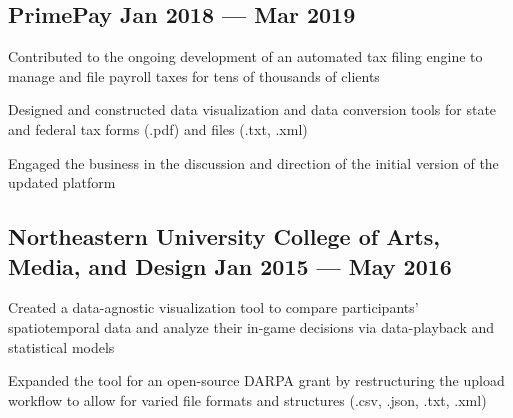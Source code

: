 \subsection{{PrimePay \hfill Jan 2018 --- Mar 2019}}
\begin{zitemize}
\item Contributed to the ongoing development of an automated tax filing engine to manage and file payroll taxes for tens of thousands of clients
\item Designed and constructed data visualization and data conversion tools for state and federal tax forms (.pdf) and files (.txt, .xml)
\item Engaged the business in the discussion and direction of the initial version of the updated platform
\end{zitemize}

\subsection{{Northeastern University College of Arts, Media, and Design \hfill Jan 2015 --- May 2016}}
\begin{zitemize}
\item Created a data-agnostic visualization tool to compare participants' spatiotemporal data and analyze their in-game decisions via data-playback and statistical models
\item Expanded the tool for an open-source DARPA grant by restructuring the upload workflow to allow for varied file formats and structures (.csv, .json, .txt, .xml)
\end{zitemize}


